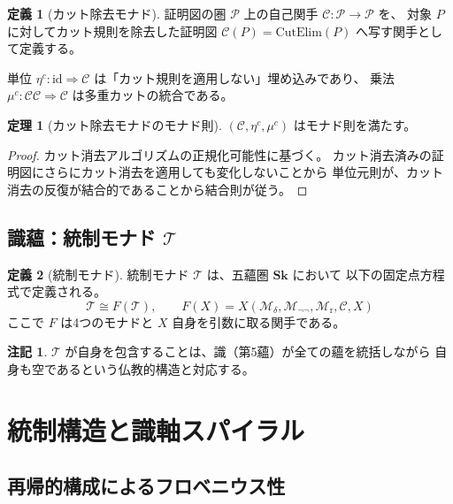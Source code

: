 \documentclass[11pt,a4paper]{article}
\theoremstyle{definition}
\newtheorem{definition}{定義}[section]
\newtheorem{theorem}{定理}[section]
\newtheorem{remark}{注記}[section]
\newcommand{\Sk}{\mathbf{Sk}}
\newcommand{\id}{\mathrm{id}}
\newcommand{\Mdelta}{\mathcal{M}_{\delta}}
\newcommand{\Mneg}{\mathcal{M}_{\neg\neg}}
\newcommand{\Mr}{\mathcal{M}_{\mathrm{r}}}
\newcommand{\Mc}{\mathcal{C}}
\newcommand{\T}{\mathcal{T}}
\begin{document}
\begin{definition}[カット除去モナド]
証明図の圏 $\mathcal{P}$ 上の自己関手 $\Mc : \mathcal{P} \to \mathcal{P}$ を、
対象 $P$ に対してカット規則を除去した証明図 $\Mc(P) = \mathrm{CutElim}(P)$
へ写す関手として定義する。

単位 $\eta^c : \id \Rightarrow \Mc$ は「カット規則を適用しない」埋め込みであり、
乗法 $\mu^c : \Mc\Mc \Rightarrow \Mc$ は多重カットの統合である。
\end{definition}

\begin{theorem}[カット除去モナドのモナド則]
$(\Mc, \eta^c, \mu^c)$ はモナド則を満たす。
\end{theorem}
\begin{proof}
カット消去アルゴリズムの正規化可能性に基づく。
カット消去済みの証明図にさらにカット消去を適用しても変化しないことから
単位元則が、カット消去の反復が結合的であることから結合則が従う。
\end{proof}

\subsection{識蘊：統制モナド \texorpdfstring{$\T$}{T}}

\begin{definition}[統制モナド]
統制モナド $\T$ は、五蘊圏 $\Sk$ において
以下の固定点方程式で定義される。
\begin{equation}
\T \cong F(\T), \qquad F(X) = X(\Mdelta, \Mneg, \Mr, \Mc, X)
\end{equation}
ここで $F$ は4つのモナドと $X$ 自身を引数に取る関手である。
\end{definition}

\begin{remark}
$\T$ が自身を包含することは、識（第5蘊）が全ての蘊を統括しながら
自身も空であるという仏教的構造と対応する。
\end{remark}

\section{統制構造と識軸スパイラル}

\subsection{再帰的構成によるフロベニウス性}
\end{document}

